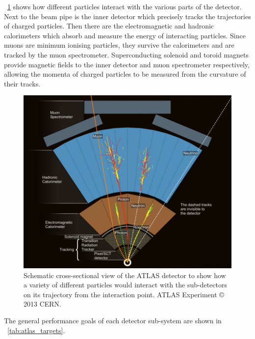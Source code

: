 \Figure~\ref{fig:atlas_wedge} shows how different particles interact with the various 
parts of the detector. Next to the beam pipe is the inner detector which precisely tracks 
the trajectories of charged particles. Then there are the electromagnetic and hadronic 
calorimeters which absorb and measure the energy of interacting particles. Since muons are
minimum ionising particles, they survive the calorimeters and are tracked by the muon 
spectrometer. Superconducting solenoid and toroid magnets provide magnetic fields to the 
inner detector and muon spectrometer respectively, allowing the momenta of charged 
particles to be measured from the curvature of their tracks.

\begin{figure}
	\includegraphics[width=\hugefigwidth]{tex/experiment/atlas_wedge}
	\caption{Schematic cross-sectional view of the ATLAS detector to show how a variety 
	of different particles would interact with the sub-detectors on its trajectory from 
	the interaction point. ATLAS Experiment \copyright\xspace 2013 CERN.}
	\label{fig:atlas_wedge}
\end{figure}

The general performance goals of each detector sub-system are shown in 
\Table~\ref{tab:atlas_targets}.

